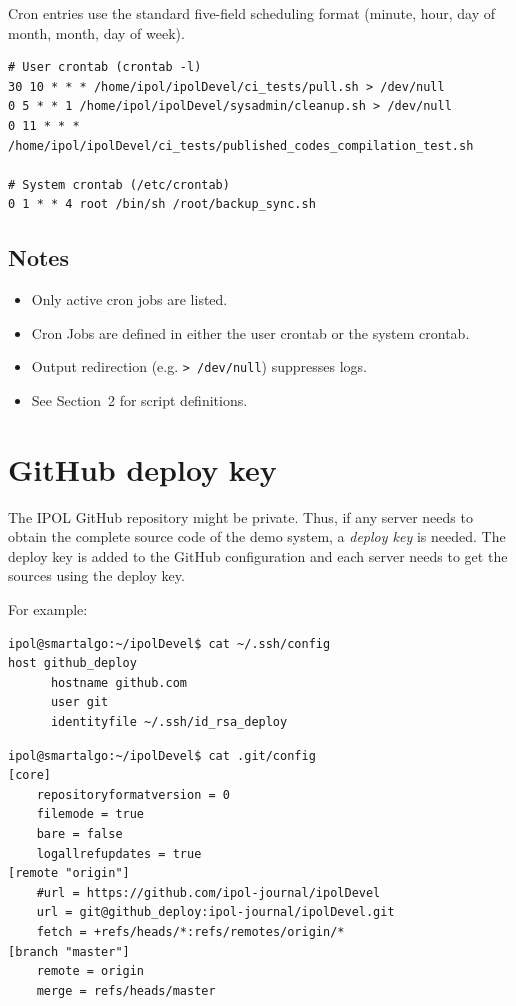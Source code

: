 \documentclass[a4paper,12pt]{article}
\begin{document}
Cron entries use the standard five-field scheduling format (minute, hour, day of month, month, day of week).

\begin{verbatim}
# User crontab (crontab -l)
30 10 * * * /home/ipol/ipolDevel/ci_tests/pull.sh > /dev/null
0 5 * * 1 /home/ipol/ipolDevel/sysadmin/cleanup.sh > /dev/null
0 11 * * * /home/ipol/ipolDevel/ci_tests/published_codes_compilation_test.sh

# System crontab (/etc/crontab)
0 1 * * 4 root /bin/sh /root/backup_sync.sh
\end{verbatim}

\subsection{Notes}

\begin{itemize}
    \item Only active cron jobs are listed.
    \item Cron Jobs are defined in either the user crontab or the system crontab.
    \item Output redirection (e.g. \texttt{> /dev/null}) suppresses logs.
    \item See Section~2 for script definitions.
\end{itemize}

\section{GitHub deploy key}
The IPOL GitHub repository might be private. Thus, if any server needs to obtain the complete source code of the demo system, a \emph{deploy key} is needed. The deploy key is added to the GitHub configuration and each server needs to get the sources using the deploy key.

For example:

\begin{verbatim}
ipol@smartalgo:~/ipolDevel$ cat ~/.ssh/config
host github_deploy
      hostname github.com
      user git
      identityfile ~/.ssh/id_rsa_deploy
\end{verbatim}

\vspace{0.15cm}

\begin{verbatim}
ipol@smartalgo:~/ipolDevel$ cat .git/config
[core]
	repositoryformatversion = 0
	filemode = true
	bare = false
	logallrefupdates = true
[remote "origin"]
	#url = https://github.com/ipol-journal/ipolDevel
	url = git@github_deploy:ipol-journal/ipolDevel.git
	fetch = +refs/heads/*:refs/remotes/origin/*
[branch "master"]
	remote = origin
	merge = refs/heads/master
\end{verbatim}
\end{document}
